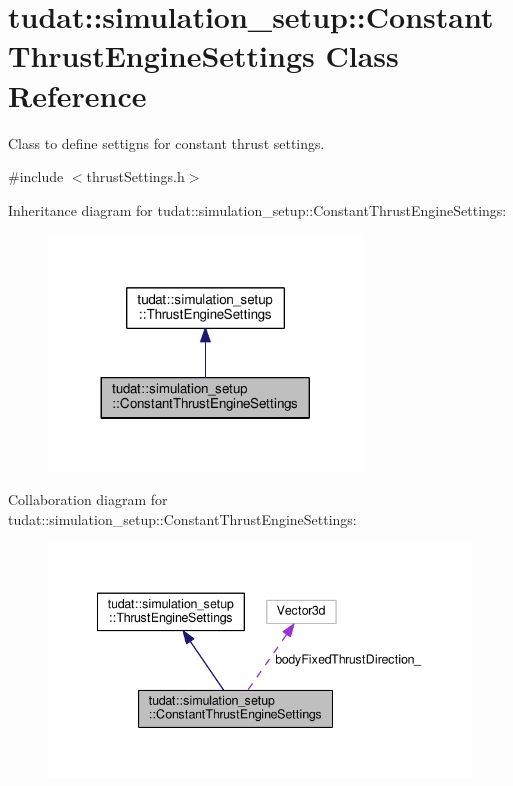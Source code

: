\hypertarget{classtudat_1_1simulation__setup_1_1ConstantThrustEngineSettings}{}\section{tudat\+:\+:simulation\+\_\+setup\+:\+:Constant\+Thrust\+Engine\+Settings Class Reference}
\label{classtudat_1_1simulation__setup_1_1ConstantThrustEngineSettings}


Class to define settigns for constant thrust settings.  




{\ttfamily \#include $<$thrust\+Settings.\+h$>$}



Inheritance diagram for tudat\+:\+:simulation\+\_\+setup\+:\+:Constant\+Thrust\+Engine\+Settings\+:
\nopagebreak
\begin{figure}[H]
\begin{center}
\leavevmode
\includegraphics[width=236pt]{classtudat_1_1simulation__setup_1_1ConstantThrustEngineSettings__inherit__graph}
\end{center}
\end{figure}


Collaboration diagram for tudat\+:\+:simulation\+\_\+setup\+:\+:Constant\+Thrust\+Engine\+Settings\+:
\nopagebreak
\begin{figure}[H]
\begin{center}
\leavevmode
\includegraphics[width=341pt]{classtudat_1_1simulation__setup_1_1ConstantThrustEngineSettings__coll__graph}
\end{center}
\end{figure}
